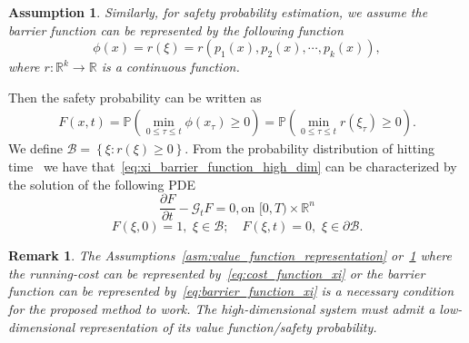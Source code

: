 \documentclass[letterpaper]{article} %
\newcommand{\pr}{\mathbb{P}}
\newtheorem{remark}[theorem]{Remark}
\newtheorem{assumption}[theorem]{Assumption}
\begin{document}
\begin{assumption}
\label{asm:barrier_function_representation}
Similarly, for safety probability estimation, we assume the barrier function can be represented by the following function
\begin{equation}
\label{eq:barrier_function_xi}
    \phi(x) = r(\xi) = r\left(p_1(x), p_2(x), \cdots, p_k(x)\right),
\end{equation}
where $r:\mathbb{R}^{k} \rightarrow \mathbb{R}$ is a continuous function.
\end{assumption}
Then the safety probability can be written as
\begin{equation}
\label{eq:xi_barrier_function_high_dim}
\begin{aligned}
    F(x,t) = \pr\left(\min_{0\leq \tau \leq t} \phi(x_\tau) \geq 0\right)  = \pr\left(\min_{0\leq \tau \leq t} r(\xi_\tau) \geq 0\right).
\end{aligned}
\end{equation}
We define $\mathcal{B} = \left\{\xi: r(\xi) \geq 0\right\}$. From the probability distribution of hitting time~\cite{patie2008first} we have that~\eqref{eq:xi_barrier_function_high_dim} can be characterized by the solution of the following PDE
\begin{equation}
    \frac{\partial F}{\partial t}-\mathcal{G}_t F =0,  \text {on }[0, T) \times \mathbb{R}^n
\end{equation}
\begin{equation}
   F(\xi,0)  =1, \,\, \xi\in\mathcal{B}; \quad F(\xi,t)  =0, \,\, \xi \in \partial \mathcal{B}.
\end{equation}





\begin{remark}
\label{rmk:low_dim_representation}
    The Assumptions~\ref{asm:value_function_representation} or~\ref{asm:barrier_function_representation} where the running-cost can be represented by~\eqref{eq:cost_function_xi} or the barrier function can be represented by~\eqref{eq:barrier_function_xi} is a necessary condition for the proposed method to work. The high-dimensional system must admit a low-dimensional representation of its value function/safety probability.
\end{remark}
\end{document}
